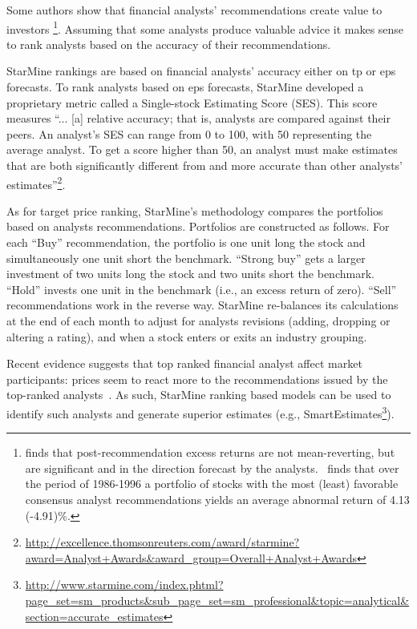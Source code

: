 \documentclass[a4paper,twoside,12pt,openright,notitlepage]{report}\usepackage[]{graphicx}\usepackage[]{color}
\begin{document}
Some authors show that financial analysts' recommendations create value to investors \citep{womack1996,barber2001}\footnote{\cite{womack1996} finds that  post-recommendation excess returns are not mean-reverting, but are significant and in the direction forecast by the analysts.~\cite{barber2001} finds that over the period of 1986-1996 a portfolio of stocks with the most (least) favorable consensus analyst recommendations yields an average abnormal return of 4.13 (-4.91)\%.}. Assuming that some analysts produce valuable advice it makes sense to rank analysts based on the accuracy of their recommendations.

StarMine rankings are based on financial analysts' accuracy either on \gls{tp} or \gls{eps} forecasts. To rank analysts based on \gls{eps} forecasts, StarMine developed a proprietary metric called a Single-stock Estimating Score (SES). This score measures ``... [a] relative accuracy; that is, analysts are compared against their peers. An analyst's SES can range from 0 to 100, with 50 representing the average analyst. To get a score higher than 50, an analyst must make estimates that are both significantly different from and more accurate than other analysts' estimates''\footnote{\url{http://excellence.thomsonreuters.com/award/starmine?award=Analyst+Awards&award_group=Overall+Analyst+Awards}}.


As for target price ranking, StarMine's methodology compares the portfolios based on analysts recommendations. Portfolios are constructed as follows. For each ``Buy'' recommendation, the portfolio is one unit long the stock and simultaneously one unit short the benchmark. ``Strong buy'' gets a larger investment of two units long the stock and two units short the benchmark. ``Hold'' invests one unit in the benchmark (i.e., an excess return of zero). ``Sell'' recommendations work in the reverse way. StarMine re-balances its calculations at the end of each month to adjust for analysts revisions (adding, dropping or altering a rating), and when a stock enters or exits an industry grouping.


Recent evidence suggests that top ranked financial analyst affect market participants: prices seem to react more to the recommendations issued by the top-ranked analysts~\citep{emery2009}. As such, StarMine ranking based models can be used to identify such analysts and generate superior estimates (e.g., SmartEstimates\footnote{\url{http://www.starmine.com/index.phtml?page_set=sm_products&sub_page_set=sm_professional&topic=analytical&section=accurate_estimates}}).
\end{document}
